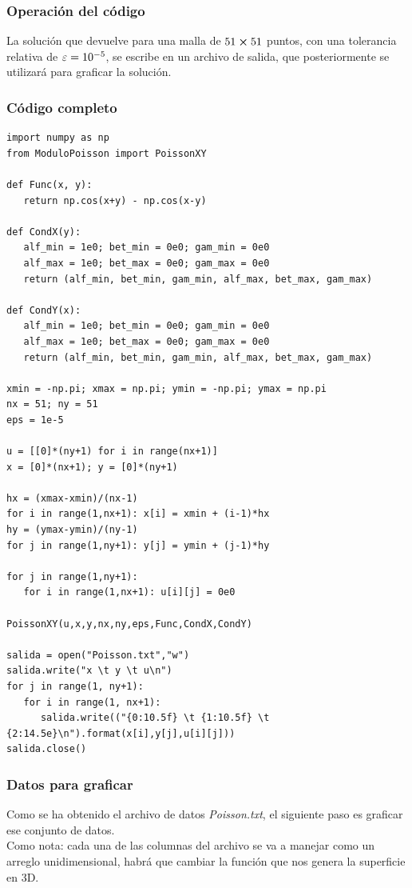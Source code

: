 \documentclass[12pt]{beamer}
\begin{document}
\begin{frame}
\frametitle{Operación del código}
La solución que devuelve  para una malla de $51 \cp 51$ puntos, con una tolerancia relativa de $\varepsilon = \num{d-5}$, se escribe en un archivo de salida, que posteriormente se utilizará para graficar la solución.
\end{frame}
\begin{frame}
\frametitle{Código completo}
\begin{lstlisting}[caption=Código para resolver la ec. de Poisson]
import numpy as np
from ModuloPoisson import PoissonXY

def Func(x, y):
   return np.cos(x+y) - np.cos(x-y)

def CondX(y):
   alf_min = 1e0; bet_min = 0e0; gam_min = 0e0
   alf_max = 1e0; bet_max = 0e0; gam_max = 0e0
   return (alf_min, bet_min, gam_min, alf_max, bet_max, gam_max)

def CondY(x):
   alf_min = 1e0; bet_min = 0e0; gam_min = 0e0
   alf_max = 1e0; bet_max = 0e0; gam_max = 0e0
   return (alf_min, bet_min, gam_min, alf_max, bet_max, gam_max)

xmin = -np.pi; xmax = np.pi; ymin = -np.pi; ymax = np.pi
nx = 51; ny = 51
eps = 1e-5

u = [[0]*(ny+1) for i in range(nx+1)]
x = [0]*(nx+1); y = [0]*(ny+1)

hx = (xmax-xmin)/(nx-1)
for i in range(1,nx+1): x[i] = xmin + (i-1)*hx
hy = (ymax-ymin)/(ny-1)
for j in range(1,ny+1): y[j] = ymin + (j-1)*hy

for j in range(1,ny+1):
   for i in range(1,nx+1): u[i][j] = 0e0

PoissonXY(u,x,y,nx,ny,eps,Func,CondX,CondY)

salida = open("Poisson.txt","w")
salida.write("x \t y \t u\n")
for j in range(1, ny+1):
   for i in range(1, nx+1):
      salida.write(("{0:10.5f} \t {1:10.5f} \t {2:14.5e}\n").format(x[i],y[j],u[i][j]))
salida.close()
\end{lstlisting}
\end{frame}
\begin{frame}
\frametitle{Datos para graficar}
Como se ha obtenido el archivo de datos \emph{Poisson.txt}, el siguiente paso es graficar ese conjunto de datos.
\\
\bigskip
\pause
Como nota: cada una de las columnas del archivo se va a manejar como un arreglo unidimensional, habrá que cambiar la función que nos genera la superficie en 3D.
\end{frame}
\end{document}
